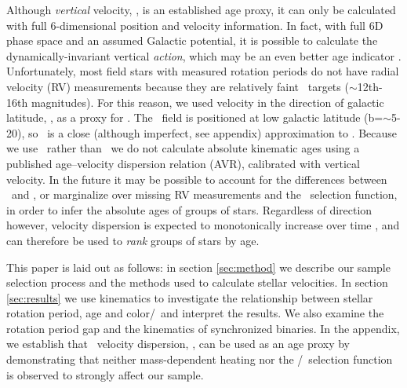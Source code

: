 Although {\it vertical} velocity, \vz, is an established age proxy, it can
only be calculated with full 6-dimensional position and velocity information.
In fact, with full 6D phase space and an assumed Galactic potential, it is
possible to calculate the dynamically-invariant vertical {\it action}, which may
be an even better age indicator \citep{beane2018, ting2019}.
Unfortunately, most field stars with measured rotation periods do not have
radial velocity (RV) measurements because they are relatively faint \kepler\
targets ($\sim$12th-16th magnitudes).
For this reason, we used velocity in the direction of galactic latitude, \vb,
as a proxy for \vz.
The \kepler\ field is positioned at low galactic latitude
(b=$\sim$5-20\degrees), so \vb\ is a close (although imperfect, see
appendix) approximation to \vz.
Because we use \vb\ rather than \vz\, we do not calculate absolute kinematic
ages using a published age--velocity dispersion relation (AVR), calibrated with
vertical velocity.
In the future it may be possible to account for the differences between \vb\
and \vz, or marginalize over missing RV measurements and the \kepler\
selection function, in order to infer the absolute ages of groups of stars.
Regardless of direction however, velocity dispersion is expected to
monotonically increase over time \citep[\eg][]{holmberg2009}, and can
therefore be used to {\it rank} groups of stars by age.

This paper is laid out as follows: in section \ref{sec:method} we describe our
sample selection process and the methods used to calculate stellar
velocities.
In section \ref{sec:results} we use kinematics to investigate the relationship
between stellar rotation period, age and color/\teff\ and interpret the
results.
We also examine the rotation period gap and the kinematics of synchronized
binaries.
In the appendix, we establish that \vb\ velocity dispersion, \sigmavb, can be
used as an age proxy by demonstrating that neither mass-dependent heating nor
the \kepler/\gaia\ selection function is observed to strongly affect our
sample.
